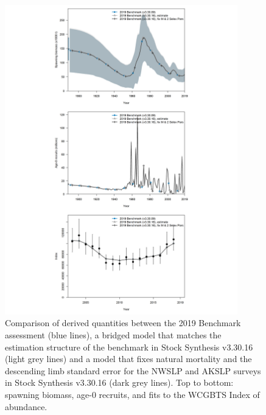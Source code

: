 \documentclass[11pt,
  english,
  a4paper,
]{article}
\begin{document}
\begin{figure}
\centering
\includegraphics[width=0.9\textwidth,height=0.9\textheight]{figs/bridging_panel.png}
\caption{Comparison of derived quantities between the 2019 Benchmark assessment (blue lines), a bridged model that matches the estimation structure of the benchmark in Stock Synthesis v3.30.16 (light grey lines) and a model that fixes natural mortality and the descending limb standard error for the NWSLP and AKSLP surveys in Stock Synthesis v3.30.16 (dark grey lines). Top to bottom: spawning biomass, age-0 recruits, and fits to the WCGBTS Index of abundance. \label{fig:bridgingpanel}}
\end{figure}

\tagmcend\tagstructend

\end{document}
